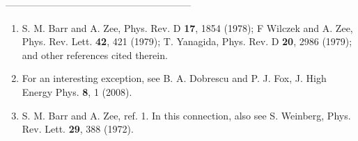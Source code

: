 \begin{center}                               
---------------------------------------------------------
\end{center}                                                                                                                                                           \begin{enumerate}
\item S. M. Barr and A. Zee, Phys. Rev. D {\bf 17}, 1854 (1978); F Wilczek and A. Zee, Phys. Rev. Lett. {\bf 42}, 421 (1979); T. Yanagida, Phys. Rev. D {\bf 20}, 2986 (1979); and other references cited therein.
\item For an interesting exception, see B. A. Dobrescu and P. J. Fox, J. High Energy Phys. {\bf 8}, 1 (2008).
\item  S. M. Barr and A. Zee, ref. 1.  In this connection, also see S. Weinberg,   Phys. Rev. Lett. {\bf 29}, 388 (1972).

\end{enumerate}
